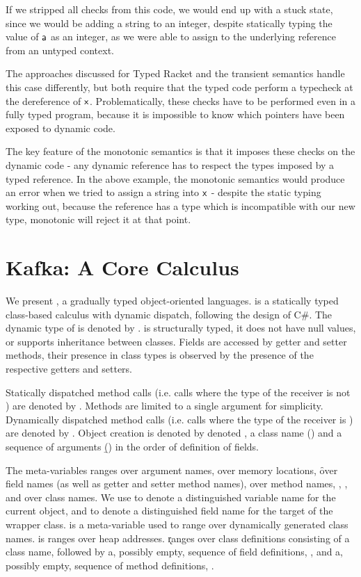 \documentclass[a4paper,USenglish]{tex/lipics-v2016}
\begin{document}
If we stripped all checks from this code, we would end up with a stuck
state, since we would be adding a string to an integer, despite statically
typing the value of ${\sf{a}}$ as an integer, as we were able to assign to the
underlying reference from an untyped context.

The approaches discussed for Typed Racket and the transient semantics
handle this case differently, but both require that the typed code perform
a typecheck at the dereference of ${\sf{x}}$. Problematically, these checks
have to be performed even in a fully typed program, because it is impossible
to know which pointers have been exposed to dynamic code.

The key feature of the monotonic semantics is that it imposes these checks
on the dynamic code - any dynamic reference has to respect the types imposed
by a typed reference. In the above example, the monotonic semantics would
produce an error when we tried to assign a string into ${\sf{x}}$ - despite the
static typing working out, because the reference has a type which is
incompatible with our new type, monotonic will reject it at that point.

\section{Kafka: A Core Calculus}

We present \kafka, a gradually typed object-oriented languages.
\kafka is a statically typed class-based calculus with dynamic dispatch, 
following the design of C\#. The dynamic type of \kafka is denoted by \any.
\kafka is structurally typed, it does not have null values, or supports
inheritance between classes. Fields are accessed by getter and setter methods, 
their presence in class types is observed by the presence of the respective 
getters and setters.

Statically dispatched method calls (i.e. calls where the type of the
receiver is not \any) are denoted by \Call\x\m\e. Methods are limited to a
single argument for simplicity. Dynamically dispatched method calls 
(i.e. calls where the type of the receiver is \any) are denoted by \DynCall\x\m\e.
Object creation is denoted by denoted \New\C{\b\e}, a class name (\C) and 
a sequence of arguments (\b\e) in the order of definition of fields.

The meta-variables \x ranges over argument names, \a over memory locations, \f
over field names (as well as getter and setter method names), \m over method
names, \C, \D, and \E over class names.  We use \this to denote a distinguished 
variable name for the current object, and \that to denote a distinguished field 
name for the target of the wrapper class. \D is a meta-variable used to range over dynamically 
generated class names. \a is ranges over heap addresses. \k ranges over 
class definitions consisting of a class name, followed by a, possibly empty, 
sequence of field definitions, \fd, and a, possibly empty, sequence of 
method definitions, \md.
\end{document}
